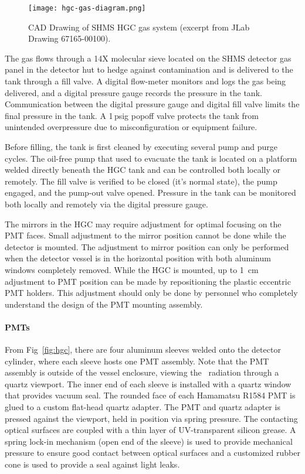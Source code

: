 {\begin{figure}[ht]
\centering
\texttt{[image: hgc-gas-diagram.png]}
\caption{CAD Drawing of SHMS HGC gas system (excerpt from JLab Drawing 67165-00100).}
\label{fig:hgc-gas-system}
\end{figure}

The gas flows through a 14X molecular sieve located on the SHMS detector gas
panel in the detector hut to hedge against contamination and is delivered to
the tank through a fill valve.  A digital flow-meter monitors and logs the gas
being delivered, and a digital pressure gauge records the pressure in the tank.
Communication between the digital pressure gauge and digital fill valve limits
the final pressure in the tank.  A 1\,psig popoff valve protects the tank from
unintended overpressure due to misconfiguration or equipment failure.

Before filling, the tank is first cleaned by executing several pump and purge
cycles. The oil-free pump that used to evacuate the tank is located on a
platform welded directly beneath the HGC tank and can be controlled both
locally or remotely.  The fill valve is verified to be closed (it's normal
state), the pump engaged, and the pump-out valve opened.  Pressure in the tank
can be monitored both locally and remotely via the digital pressure gauge.

The mirrors in the HGC may require adjustment for optimal focusing on the PMT
faces. Small adjustment to the mirror position cannot be done while the
detector is mounted. The adjustment to mirror position can only be performed
when the detector vessel is in the horizontal position with both aluminum
windows completely removed. While the HGC is mounted, up to 1~cm adjustment to
PMT position can be made by repositioning the plastic eccentric PMT holders.
This adjustment should only be done by personnel who completely understand the
design of the PMT mounting assembly. 


\paragraph{PMTs} From Fig~\ref{fig:hgc}, there are four aluminum sleeves welded onto
the detector cylinder, where each sleeve hosts one PMT assembly. Note
that the PMT assembly is outside of the vessel enclosure, viewing
the \Cerenkov\ radiation through a quartz viewport. The inner end of
each sleeve is installed with a quartz window that provides vacuum
seal.  The rounded face of each Hamamatsu R1584 PMT is glued to a custom
flat-head quartz adapter. The PMT and quartz adapter is pressed
against the viewport, held in position via spring pressure. The
contacting optical surfaces are coupled with a thin layer of
UV-transparent silicon grease. A spring lock-in mechanism (open end of
the sleeve) is used to provide mechanical pressure to ensure good
contact between optical surfaces and a customized rubber cone is used
to provide a seal against light leaks.

}
